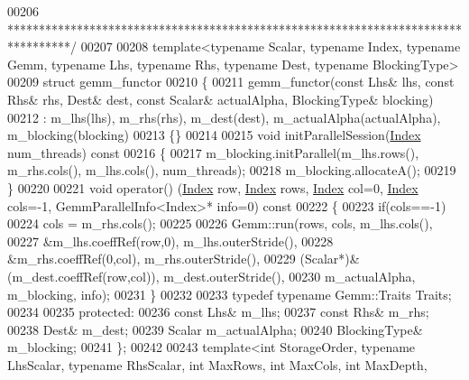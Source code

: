 \begin{DoxyCode}
00206 \textcolor{comment}{**********************************************************************************/}
00207 
00208 \textcolor{keyword}{template}<\textcolor{keyword}{typename} Scalar, \textcolor{keyword}{typename} Index, \textcolor{keyword}{typename} Gemm, \textcolor{keyword}{typename} Lhs, \textcolor{keyword}{typename} Rhs, \textcolor{keyword}{typename} Dest, \textcolor{keyword}{
      typename} BlockingType>
00209 \textcolor{keyword}{struct }gemm\_functor
00210 \{
00211   gemm\_functor(\textcolor{keyword}{const} Lhs& lhs, \textcolor{keyword}{const} Rhs& rhs, Dest& dest, \textcolor{keyword}{const} Scalar& actualAlpha, BlockingType& 
      blocking)
00212     : m\_lhs(lhs), m\_rhs(rhs), m\_dest(dest), m\_actualAlpha(actualAlpha), m\_blocking(blocking)
00213   \{\}
00214 
00215   \textcolor{keywordtype}{void} initParallelSession(\hyperlink{namespace_eigen_a62e77e0933482dafde8fe197d9a2cfde}{Index} num\_threads)\textcolor{keyword}{ const}
00216 \textcolor{keyword}{  }\{
00217     m\_blocking.initParallel(m\_lhs.rows(), m\_rhs.cols(), m\_lhs.cols(), num\_threads);
00218     m\_blocking.allocateA();
00219   \}
00220 
00221   \textcolor{keywordtype}{void} operator() (\hyperlink{namespace_eigen_a62e77e0933482dafde8fe197d9a2cfde}{Index} row, \hyperlink{namespace_eigen_a62e77e0933482dafde8fe197d9a2cfde}{Index} rows, \hyperlink{namespace_eigen_a62e77e0933482dafde8fe197d9a2cfde}{Index} col=0, \hyperlink{namespace_eigen_a62e77e0933482dafde8fe197d9a2cfde}{Index} cols=-1, 
      GemmParallelInfo<Index>* info=0)\textcolor{keyword}{ const}
00222 \textcolor{keyword}{  }\{
00223     \textcolor{keywordflow}{if}(cols==-1)
00224       cols = m\_rhs.cols();
00225 
00226     Gemm::run(rows, cols, m\_lhs.cols(),
00227               &m\_lhs.coeffRef(row,0), m\_lhs.outerStride(),
00228               &m\_rhs.coeffRef(0,col), m\_rhs.outerStride(),
00229               (Scalar*)&(m\_dest.coeffRef(row,col)), m\_dest.outerStride(),
00230               m\_actualAlpha, m\_blocking, info);
00231   \}
00232 
00233   \textcolor{keyword}{typedef} \textcolor{keyword}{typename} Gemm::Traits Traits;
00234 
00235   \textcolor{keyword}{protected}:
00236     \textcolor{keyword}{const} Lhs& m\_lhs;
00237     \textcolor{keyword}{const} Rhs& m\_rhs;
00238     Dest& m\_dest;
00239     Scalar m\_actualAlpha;
00240     BlockingType& m\_blocking;
00241 \};
00242 
00243 \textcolor{keyword}{template}<\textcolor{keywordtype}{int} StorageOrder, \textcolor{keyword}{typename} LhsScalar, \textcolor{keyword}{typename} RhsScalar, \textcolor{keywordtype}{int} MaxRows, \textcolor{keywordtype}{int} MaxCols, \textcolor{keywordtype}{int} MaxDepth, \textcolor{keywordtype}{
}
\end{DoxyCode}
